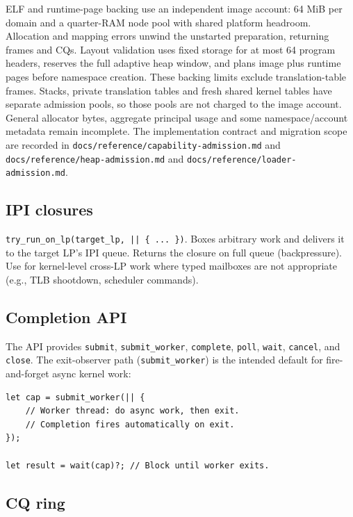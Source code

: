 ELF and runtime-page backing use an independent image account: 64 MiB per
domain and a quarter-RAM node pool with shared platform headroom. Allocation
and mapping errors unwind the unstarted preparation, returning frames and CQs.
Layout validation uses fixed storage for at most 64 program headers, reserves
the full adaptive heap window, and plans image plus runtime pages before
namespace creation. These backing limits exclude translation-table frames.
Stacks, private translation tables and fresh shared kernel tables have separate
admission pools, so those pools are not charged to the image account. General
allocator bytes, aggregate principal usage and some namespace/account metadata
remain incomplete. The implementation contract
and migration scope are recorded in
\texttt{docs/reference/capability-admission.md} and
\texttt{docs/reference/heap-admission.md} and
\texttt{docs/reference/loader-admission.md}.

\subsection{IPI closures}

\texttt{try\_run\_on\_lp(target\_lp, || \{ ... \})}. Boxes arbitrary work and
delivers it to the target LP's IPI queue. Returns the closure on full queue
(backpressure). Use for kernel-level cross-LP work where typed mailboxes are not
appropriate (e.g., TLB shootdown, scheduler commands).

\subsection{Completion API}

The API provides \texttt{submit}, \texttt{submit\_worker}, \texttt{complete},
\texttt{poll}, \texttt{wait}, \texttt{cancel}, and \texttt{close}. The exit-observer path
(\texttt{submit\_worker}) is the intended default for fire-and-forget async
kernel work:

\begin{lstlisting}[style=rustCode]
let cap = submit_worker(|| {
    // Worker thread: do async work, then exit.
    // Completion fires automatically on exit.
});

let result = wait(cap)?; // Block until worker exits.
\end{lstlisting}

\subsection{CQ ring}

